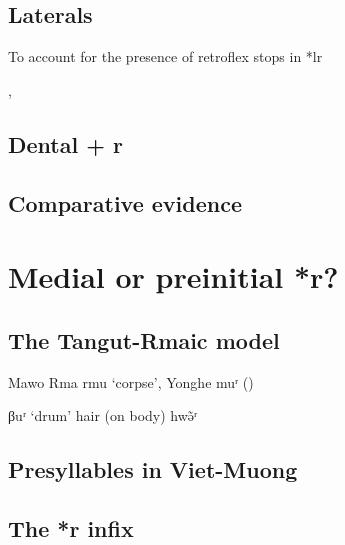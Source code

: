 \documentclass[oldfontcommands,oneside,a4paper,11pt]{article}
\newcommand{\ipa}[1]{{\phon \mbox{#1}}} %
\begin{document}
\subsection{Laterals}
To account for the presence of retroflex stops in 
*lr

\citet[217-225]{starostin89}, \citet[36-40]{sagart99roc}


\citet[78]{baroni14invariant}

\citet{nikitina12logophoric}

\subsection{Dental + r}

%

\subsection{Comparative evidence}

\section{Medial or preinitial *r?}

\subsection{The Tangut-Rmaic model}
 
 Mawo Rma \ipa{rmu} `corpse', Yonghe \ipa{muʳ} (\citealt[41]{sims14yonghe})

\ipa{βuʳ} `drum'
hair (on body) \ipa{hwə̃ʳ}
\subsection{Presyllables in Viet-Muong}

\subsection{The *r infix}

 \citet{sagart99roc}
\end{document}

